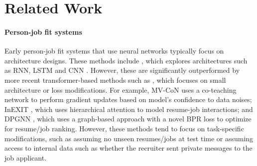 \section{Related Work}
\label{sec:Related Work}

\paragraph{Person-job fit systems}


Early person-job fit systems that use neural networks typically focus on architecture designs. These methods include \citet{APJFNN,pjfnn,cnn-lstm-siamese,jiang2020learning,10169716}, which explores
architectures such as RNN, LSTM \cite{staudemeyer2019understanding} and CNN \cite{oshea2015introduction}.
However, these are significantly outperformed by more recent transformer-based methods such as \citet{siamese,cnn-lstm-siamese,bian-etal-2019-domain,Zhang2023FedPJFFC}, which focuses on small architecture or loss modifications.
For example, MV-CoN \cite{mvcon} uses a co-teaching network \cite{malach2018decoupling} to perform gradient updates based on model's confidence to data noises; InEXIT \cite{InEXIT}, which uses hierarchical attention to model resume-job interactions; and DPGNN \cite{DPGNN}, which uses a graph-based approach with a novel BPR loss to optimize for resume/job ranking.
However, these methods tend to focus on task-specific modifications, such as assuming no unseen resumes/jobs at test time or assuming access to internal data such as whether the recruiter sent private messages to the job applicant.
